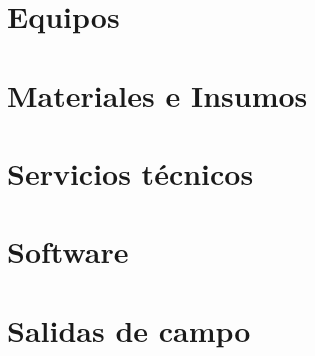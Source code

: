 \documentclass{report}
\begin{document}
\section*{Equipos}

\section*{Materiales e Insumos}

\section*{Servicios t\'ecnicos}

\section*{Software}

\section*{Salidas de campo}
\end{document}
